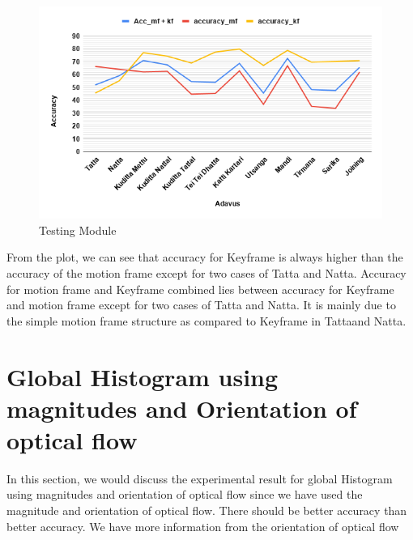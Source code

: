 \begin{figure}[H]
    \hspace{-2.5cm}
    \includegraphics[scale= 0.8]{./Pictures/hist.png}
    \caption{Testing Module}
    \label{fig:Ch06F001}
\end{figure}

From the plot, we can see that accuracy for Keyframe is always higher than the accuracy of the motion frame except for two cases of Tatta and Natta.
Accuracy for motion frame and Keyframe combined lies between accuracy for Keyframe and motion frame except for two cases of Tatta and Natta. It is mainly due to the simple motion frame structure as compared to Keyframe in Tattaand Natta.



\section{Global Histogram using  magnitudes and Orientation of optical flow}
In this section, we would discuss the experimental result for global Histogram using magnitudes and orientation of optical flow since we have used the magnitude and orientation of optical flow. There should be better accuracy than better accuracy.
We have more information from the orientation of optical flow


